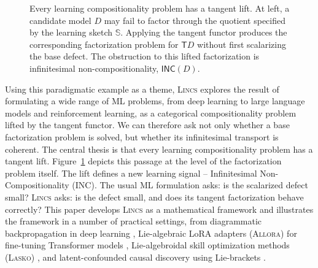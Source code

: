 \documentclass{article}
\newcommand{\T}{\mathsf{T}}
\newcommand{\INC}{\mathsf{INC}}
\begin{document}
\begin{figure}[t]
\caption{Every learning compositionality problem has a tangent lift.  At
left, a candidate model $D$ may fail to factor through the quotient specified
by the learning sketch $\mathbb S$.  Applying the tangent functor produces the
corresponding factorization problem for $\T D$ without first scalarizing the
base defect.  The obstruction to this lifted factorization is infinitesimal
non-compositionality, $\INC(D)$.}
\label{fig:tangent-lift-inc}
\end{figure}

Using this paradigmatic example as a theme,  \textsc{Lincs}   explores the result of formulating a wide range of  ML
problems, from deep learning to large language models and reinforcement learning, as a categorical compositionality problem lifted by the tangent functor. We can therefore ask not only whether a
base factorization problem is solved, but whether its infinitesimal transport
is coherent. The central thesis is that every learning compositionality problem has a tangent lift.  Figure~\ref{fig:tangent-lift-inc} depicts this passage at the level of the factorization problem itself. The lift defines a new learning signal -- Infinitesimal Non-Compositionality (INC). The usual ML formulation asks: is the scalarized defect small? \textsc{Lincs}   asks: is the defect small, and does its tangent factorization behave correctly?  This paper develops \textsc{Lincs}   as a mathematical framework and illustrates the framework in a number of practical settings, from diagrammatic backpropagation in deep learning \citep{mahadevan2026catagi}, Lie-algebraic LoRA adapters (\textsc{Allora}) for fine-tuning Transformer models \citep{mahadevan2026allora}, Lie-algebroidal skill optimization methods (\textsc{Lasko}) \citep{mahadevan2026lasko}, and latent-confounded causal discovery using Lie-brackets \citep{mahadevan2026bridge}.
\end{document}
